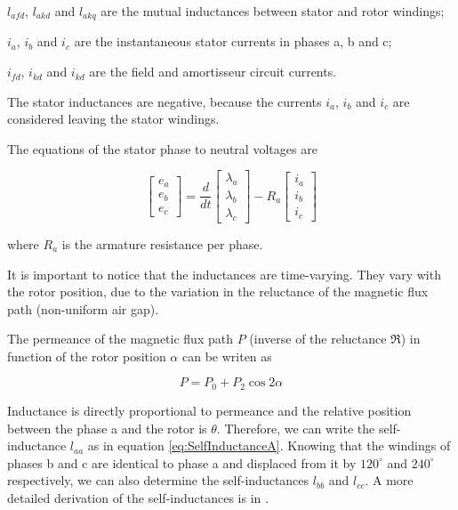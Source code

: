 $l_{afd}$, $l_{akd}$ and $l_{akq}$ are the mutual inductances between stator and rotor windings;

$i_a$, $i_b$ and $i_c$ are the instantaneous stator currents in phases a, b and c;

$i_{fd}$, $i_{kd}$ and $i_{kd}$ are the field and amortisseur circuit currents.

The stator inductances are negative, because the currents $i_a$, $i_b$ and $i_c$ are considered leaving the stator windings.
 
The equations of the stator phase to neutral voltages are

\begin{equation} \label{eq:VotlageStator}
	\begin{bmatrix}
		e_a \\
		e_b \\
		e_c
	\end{bmatrix}
	=
	\frac{d}{dt}
	\begin{bmatrix}
		\lambda_a \\
		\lambda_b \\
		\lambda_c
	\end{bmatrix}
	-R_a
	\begin{bmatrix}
		i_a \\
		i_b \\
		i_c
	\end{bmatrix}
\end{equation}

where $R_a$ is the armature resistance per phase.

It is important to notice that the inductances are time-varying. They vary with the rotor position, due to the variation in the reluctance of the magnetic flux path (non-uniform air gap). 

The permeance of the magnetic flux path $P$ (inverse of the reluctance $\Re$) in function of the rotor position $\alpha$ can be writen as

\begin{equation}
	P = P_0 + P_2 \cos 2 \alpha
\end{equation}

Inductance is directly proportional to permeance and the relative position between the phase a and the rotor is $\theta$. Therefore, we can write the self-inductance $l_{aa}$ as in equation \ref{eq:SelfInductanceA}. Knowing that the windings of phases b and c are identical to phase a and displaced from it by  $120^{\circ}$ and $240^{\circ}$ respectively, we can also determine the self-inductances $l_{bb}$ and $l_{cc}$. A more detailed derivation of the self-inductances is in \cite{kundur1994power}.

